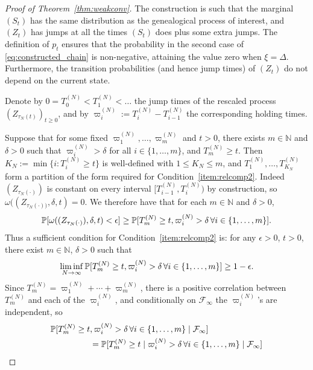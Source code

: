 \begin{proof}[Proof of Theorem~\ref{thm:weakconv}]
The construction is such that the marginal $(S_t)$ has the same distribution as the genealogical process of interest, and $(Z_t)$ has jumps at all the times $(S_t)$ does plus some extra jumps. The definition of $p_t$ ensures that the probability in the second case of \eqref{eq:constructed_chain} is non-negative, attaining the value zero when $\xi=\Delta$.
Furthermore, the transition probabilities (and hence jump times) of $(Z_t)$ do not depend on the current state.

Denote by $0=T_0^{(N)}<T_1^{(N)}<\dots$ the jump times of the rescaled process $(Z_{\tau_N(t)})_{t\geq0}$, and by $\varpi_i^{(N)} := T_i^{(N)} - T_{i-1}^{(N)}$ the corresponding holding times.

Suppose that for some fixed $\varpi_1^{(N)}, \dots, \varpi_m^{(N)}$ and $t>0$, there exists $m \in \mathbb{N}$ and $\delta >0$ such that
$\varpi_i^{(N)} > \delta$ for all $i\in \{1,\dots,m\}$, and
$T_m^{(N)} \geq t$.
Then
$K_N := \min\{i : T_i^{(N)} \geq t\}$
is well-defined with $1\leq K_N \leq m$,
and $T_1^{(N)} , \dots, T_{K_N}^{(N)}$ form a partition of the form required for Condition~\ref{item:relcomp2}.
Indeed $(Z_{\tau_N(\cdot)})$ is constant on every interval $[ T_{i-1}^{(N)} , T_i^{(N)} )$ by construction, so $\omega( (Z_{\tau_N(\cdot))} , \delta, t ) = 0$. 
We therefore have that
for each $m \in \mathbb{N}$ and $\delta >0$,
\begin{equation*}
\mathbb{P}[ \omega( (Z_{\tau_N(\cdot)}) , \delta, t ) < \epsilon ]
\geq \mathbb{P}[ T_m^{(N)} \geq t, \varpi_i^{(N)} > \delta \,\forall i\in \{1,\dots,m\} ] .
\end{equation*}
Thus a sufficient condition for Condition~\ref{item:relcomp2} is: 
for any $\epsilon>0$, $t>0$, there exist $m\in\mathbb{N}$, $\delta>0$ such that
\begin{equation}\label{eq:condition2b}
\liminf_{N\to\infty} 
        \mathbb{P}[ T_m^{(N)} \geq t, \varpi_i^{(N)} > \delta \,\forall i\in \{1,\dots,m\} ]
\geq 1-\epsilon .
\end{equation}
Since $T_m^{(N)} = \varpi_1^{(N)} + \cdots + \varpi_m^{(N)}$, there is a positive correlation between $T_m^{(N)}$ and each of the $\varpi_i^{(N)}$, and conditionally on $\mathcal{F}_\infty$ the $\varpi_i^{(N)}$'s are independent, so
\begin{align*}
\Prob[ T_m^{(N)} \geq t &, \varpi_i^{(N)} > \delta \,\forall i\in \{1,\dots,m\} 
        \mid \mathcal{F}_\infty ] \\
&= \Prob[ T_m^{(N)} \geq t \mid \varpi_i^{(N)} > \delta \,\forall i\in \{1,\dots,m\} 
        \mid \mathcal{F}_\infty ]

\end{align*}
\end{proof}
